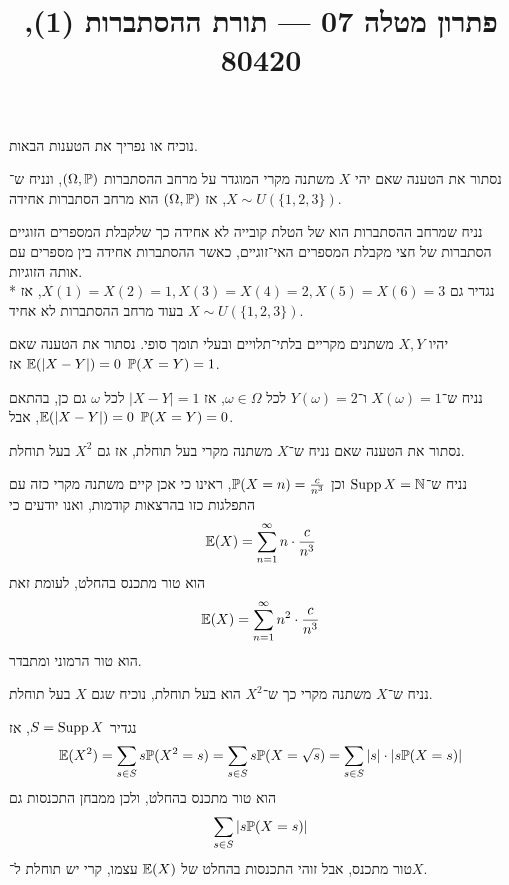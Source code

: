 
\title{פתרון מטלה 07 --- תורת ההסתברות (1), 80420}

\DeclareMathOperator{\Supp}{Supp}


\maketitle
\maketitleprint{}

\question{}
נוכיח או נפריך את הטענות הבאות.

\subquestion{}
נסתור את הטענה שאם יהי $X$ משתנה מקרי המוגדר על מרחב ההסתברות $(\Omega, \mathbb{P})$, ונניח ש־$X \sim U(\{1, 2, 3\})$, אז $(\Omega, \mathbb{P})$ הוא מרחב הסתברות אחידה.
\begin{solution}
	נניח שמרחב ההסתברות הוא של הטלת קובייה לא אחידה כך שלקבלת המספרים הזוגיים הסתברות של חצי מקבלת המספרים האי־זוגיים, כאשר ההסתברות אחידה בין מספרים עם אותה הזוגיות. \\*
	נגדיר גם $X(1) = X(2) = 1, X(3) = X(4) = 2, X(5) = X(6) = 3$, אז $X \sim U(\{1, 2, 3\})$ בעוד מרחב ההסתברות לא אחיד.
\end{solution}

\subquestion{}
יהיו $X, Y$ משתנים מקריים בלתי־תלויים ובעלי תומך סופי.
נסתור את הטענה שאם $\mathbb{E}(|X - Y|) = 0$ אז $\mathbb{P}(X = Y) = 1$.
\begin{solution}
	נניח ש־$X(\omega) = 1$ ו־$Y(\omega) = 2$ לכל $\omega \in \Omega$, אז $|X - Y| = 1$ לכל $\omega$ גם כן, בהתאם $\mathbb{E}(|X - Y|) = 0$, אבל $\mathbb{P}(X = Y) = 0$.
\end{solution}

\subquestion{}
נסתור את הטענה שאם נניח ש־$X$ משתנה מקרי בעל תוחלת, אז גם $X^2$ בעל תוחלת.
\begin{solution}
	נניח ש־$\Supp X = \NN$ וכן $\mathbb{P}(X = n) = \frac{c}{n^3}$, ראינו כי אכן קיים משתנה מקרי כזה עם התפלגות כזו בהרצאות קודמות, ואנו יודעים כי
	\[
		\mathbb{E}(X) = \sum_{n = 1}^{\infty} n \cdot \frac{c}{n^3}
	\]
	הוא טור מתכנס בהחלט, לעומת זאת
	\[
		\mathbb{E}(X) = \sum_{n = 1}^{\infty} n^2 \cdot \frac{c}{n^3}
	\]
	הוא טור הרמוני ומתבדר.
\end{solution}

\subquestion{}
נניח ש־$X$ משתנה מקרי כך ש־$X^2$ הוא בעל תוחלת, נוכיח שגם $X$ בעל תוחלת.
\begin{solution}
	נגדיר $S = \operatorname{Supp} X$, אז
	\[
		\mathbb{E}(X^2)
		= \sum_{s \in S} s \mathbb{P}(X^2 = s)
		= \sum_{s \in S} s \mathbb{P}(X = \sqrt{s})
		= \sum_{s \in S} |s| \cdot |s \mathbb{P}(X = s)|
	\]
	הוא טור מתכנס בהחלט, ולכן ממבחן התכנסות גם
	\[
		\sum_{s \in S} |s \mathbb{P}(X = s)|
	\]
	טור מתכנס, אבל זוהי התכנסות בהחלט של $\mathbb{E}(X)$ עצמו, קרי יש תוחלת ל־$X$.
\end{solution}

